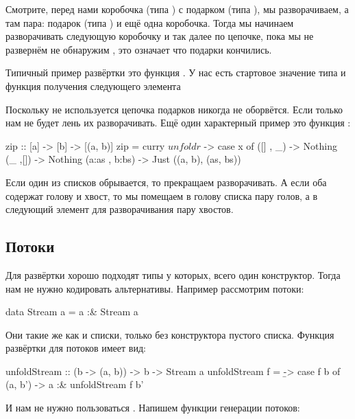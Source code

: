 Смотрите, перед нами коробочка (типа ) с подарком (типа ),
мы разворачиваем, а там пара: подарок (типа ) и ещё одна
коробочка. Тогда мы начинаем разворачивать следующую коробочку и так
далее по цепочке, пока мы не развернём не обнаружим , это
означает что подарки кончились.

Типичный пример развёртки это функция . У нас есть стартовое
значение типа  и функция получения следующего элемента 



Поскольку  не используется цепочка подарков никогда не
оборвётся. Если только нам не будет лень их разворачивать. Ещё один
характерный пример это функция :


\begin{code}
zip :: [a] -> [b] -> [(a, b)]
zip = curry $ unfoldr $ \x -> case x of
    ([]     , _)     -> Nothing
    (_      ,[])     -> Nothing
    (a:as   , b:bs)  -> Just ((a, b), (as, bs)) 
\end{code}

Если один из списков обрывается, то прекращаем разворачивать. А если оба
содержат голову и хвост, то мы помещаем в голову списка пару голов, а в
следующий элемент для разворачивания пару хвостов.

\subsection{Потоки}

Для развёртки хорошо подходят типы у которых, всего один конструктор.
Тогда нам не нужно кодировать альтернативы. Например рассмотрим потоки:


\begin{code}
data Stream a = a :& Stream a
\end{code}

Они такие же как и списки, только без конструктора пустого списка.
Функция развёртки для потоков имеет вид:


\begin{code}
unfoldStream :: (b -> (a, b)) -> b -> Stream a
unfoldStream f  = \b -> case f b of
    (a, b') -> a :& unfoldStream f b'
\end{code}

И нам не нужно пользоваться . Напишем функции генерации
потоков:


